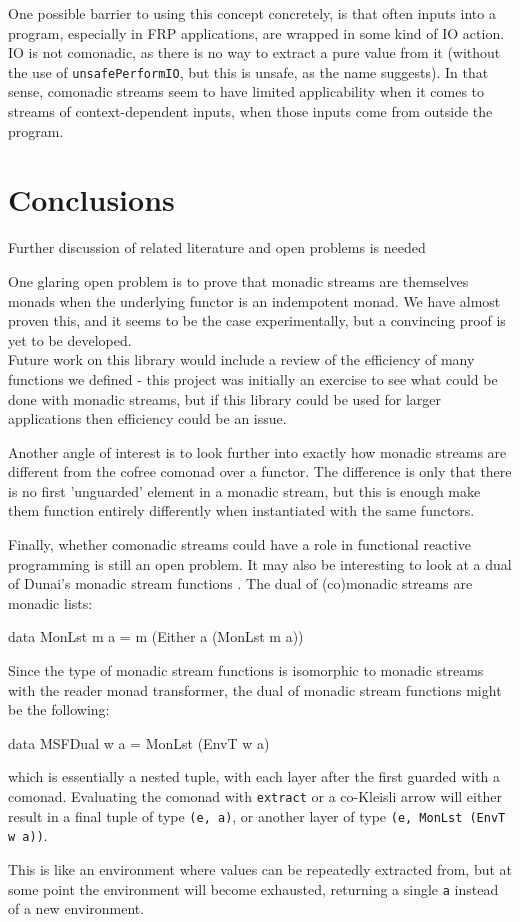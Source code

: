\documentclass{article}
\begin{document}
One possible barrier to using this concept concretely, is that often inputs into a program, especially in FRP applications, are wrapped in some kind of IO action. IO is not comonadic, as there is no way to extract a pure value from it (without the use of \verb+unsafePerformIO+, but this is unsafe, as the name suggests). In that sense, comonadic streams seem to have limited applicability when it comes to streams of context-dependent inputs, when those inputs come from outside the program.

\section{Conclusions}

\begin{ccomment} 
	Further discussion of related literature and open problems is needed
\end{ccomment}

One glaring open problem is to prove that monadic streams are themselves monads when the underlying functor is an indempotent monad. We have almost proven this, and it seems to be the case experimentally, but a convincing proof is yet to be developed.\\

Future work on this library would include a review of the efficiency of many functions we defined - this project was initially an exercise to see what could be done with monadic streams, but if this library could be used for larger applications then efficiency could be an issue. 

Another angle of interest is to look further into exactly how monadic streams are different from the cofree comonad over a functor. The difference is only that there is no first 'unguarded' element in a monadic stream, but this is enough make them function entirely differently when instantiated with the same functors.

Finally, whether comonadic streams could have a role in functional reactive programming is still an open problem. It may also be interesting to look at a dual of Dunai's monadic stream functions \cite{dunai}. The dual of (co)monadic streams are monadic lists:
\begin{haskell}
data MonLst m a = m (Either a (MonLst m a)) 
\end{haskell}
Since the type of monadic stream functions is isomorphic to monadic streams with the reader monad transformer, the dual of monadic stream functions might be the following:
\begin{haskell}
data MSFDual w a = MonLst (EnvT w a)
\end{haskell}
which is essentially a nested tuple, with each layer after the first guarded with a comonad. Evaluating the comonad with \verb+extract+ or a co-Kleisli arrow will either result in a final tuple of type \verb+(e, a)+, or another layer of type \verb+(e, MonLst (EnvT w a))+. 

This is like an environment where values can be repeatedly extracted from, but at some point the environment will become exhausted, returning a single \verb+a+ instead of a new environment.


\end{document}
